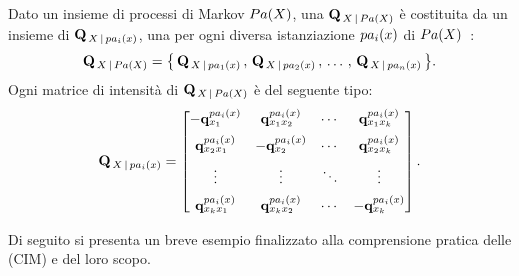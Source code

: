 \begin{definizione}
\label{defn:cim}
Dato un insieme di processi di Markov $Pa(\mathnormal{X})$, una \im*{} \cond*{} $\mathbf{Q}_{\,\mathnormal{X}\,\arrowvert\,Pa(\mathnormal{X})}$ è costituita da un insieme di \im{} $\mathbf{Q}_{\,\mathnormal{X}\,\arrowvert\,pa_i(\mathnormal{x})}$, una per ogni diversa istanziazione $pa_i(\mathnormal{x})$ di $Pa(\mathnormal{X})$~\citep{Stella2012}:
\[
\mathbf{Q}_{\,\mathnormal{X}\,\arrowvert\,Pa(\mathnormal{X})}=\big\{\,\mathbf{Q}_{\,\mathnormal{X}\,\arrowvert\,pa_1(\mathnormal{x})}\,,\,\mathbf{Q}_{\,\mathnormal{X}\,\arrowvert\,pa_2(\mathnormal{x})}\,,\,\dotsc\,,\,\mathbf{Q}_{\,\mathnormal{X}\,\arrowvert\,pa_n(\mathnormal{x})}\,\big\}\text{.}
\]
Ogni matrice di intensità di $\mathbf{Q}_{\,\mathnormal{X}\,\arrowvert\,Pa(\mathnormal{X})}$ è del seguente tipo:\\
\[
\mathbf{Q}_{\,\mathnormal{X}\,\arrowvert\,pa_i(\mathnormal{x})}=
\begin{bmatrix}
-\boldsymbol{\textbf{\text{q}}}_{\mathnormal{x}_1}^{pa_i(\mathnormal{x})}   & \boldsymbol{\textbf{\text{q}}}_{\mathnormal{x}_1\mathnormal{x}_2}^{pa_i(\mathnormal{x})} & \cdots & \boldsymbol{\textbf{\text{q}}}_{\mathnormal{x}_1\mathnormal{x}_k}^{pa_i(\mathnormal{x})}\\[0.5em]
\boldsymbol{\textbf{\text{q}}}_{\mathnormal{x}_2\mathnormal{x}_1}^{pa_i(\mathnormal{x})} & -\boldsymbol{\textbf{\text{q}}}_{\mathnormal{x}_2}^{pa_i(\mathnormal{x})}   & \cdots & \boldsymbol{\textbf{\text{q}}}_{\mathnormal{x}_2\mathnormal{x}_k}^{pa_i(\mathnormal{x})}\\[0.5em]
\vdots           & \vdots           & \ddots & \vdots\\[0.5em]
\boldsymbol{\textbf{\text{q}}}_{\mathnormal{x}_k\mathnormal{x}_1}^{pa_i(\mathnormal{x})} & \boldsymbol{\textbf{\text{q}}}_{\mathnormal{x}_k\mathnormal{x}_2}^{pa_i(\mathnormal{x})} & \cdots & -\boldsymbol{\textbf{\text{q}}}_{\mathnormal{x}_k}^{pa_i(\mathnormal{x})}
\end{bmatrix}
\text{.}
\]
\end{definizione}
Di seguito si presenta un breve esempio finalizzato alla comprensione pratica delle \cim{} (\acs{CIM}) e del loro scopo.
